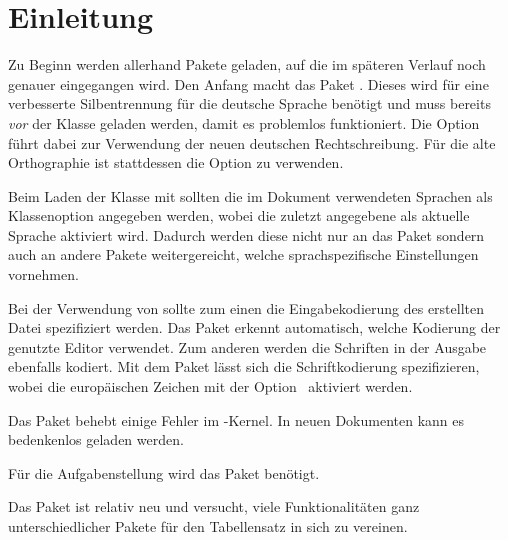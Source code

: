 \documentclass[english,ngerman]{tudscrartcl}
\begin{document}
\section{Einleitung}
\label{sec:introduction}
Zu Beginn werden allerhand Pakete geladen, auf die im späteren Verlauf noch 
genauer eingegangen wird. Den Anfang macht das Paket . 
Dieses wird für eine verbesserte Silbentrennung für die deutsche Sprache 
benötigt und muss bereits \emph{vor} der Klasse geladen werden, damit es 
problemlos funktioniert. Die Option  führt dabei zur 
Verwendung der neuen deutschen Rechtschreibung. Für die alte Orthographie ist 
stattdessen die Option  zu verwenden.

Beim Laden der Klasse mit  sollten die im Dokument 
verwendeten Sprachen als Klassenoption angegeben werden, wobei die zuletzt 
angegebene als aktuelle Sprache aktiviert wird. Dadurch werden diese nicht nur 
an das Paket  sondern auch an andere Pakete weitergereicht, 
welche sprachspezifische Einstellungen vornehmen.
%
%
Bei der Verwendung von  sollte zum einen die Eingabekodierung 
des erstellten Datei spezifiziert werden. Das Paket  erkennt 
automatisch, welche Kodierung der genutzte Editor verwendet. Zum anderen werden 
die Schriften in der Ausgabe ebenfalls kodiert. Mit dem Paket  
lässt sich die Schriftkodierung spezifizieren, wobei die europäischen Zeichen 
mit der Option~ aktiviert werden.
%
\begin{Tutorial*}
\usepackage{selinput}
\usepackage[T1]{fontenc}
\end{Tutorial*}
%
Das Paket  behebt einige Fehler im -Kernel. 
In neuen Dokumenten kann es bedenkenlos geladen werden.
%
\begin{Tutorial*}
\usepackage{fixltx2e}
\end{Tutorial*}
%
Für die Aufgabenstellung wird das Paket  benötigt.
%
\begin{Tutorial*}
\usepackage{tudscrsupervisor}
\end{Tutorial*}
%
Das Paket  ist relativ neu und versucht, viele Funktionalitäten 
ganz unterschiedlicher Pakete für den Tabellensatz in sich zu vereinen.
\end{document}
